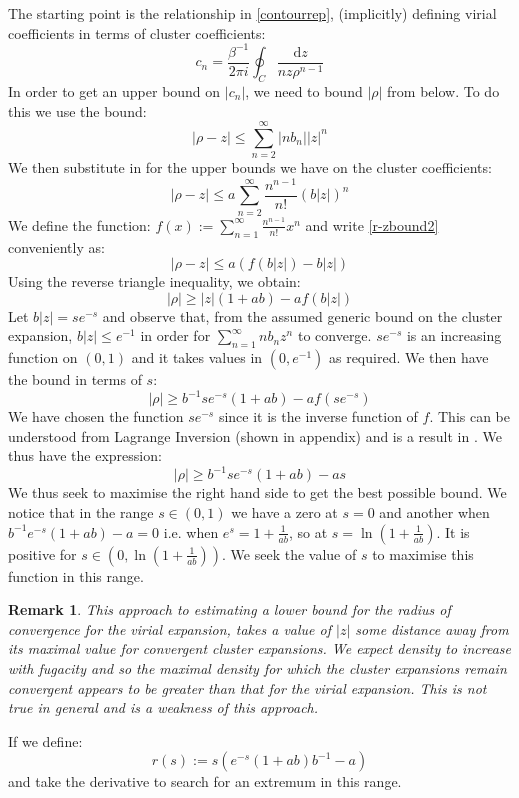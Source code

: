 \documentclass[reqno]{amsart}
\def\be{\begin{equation}}
\def\ee{\end{equation}}
\numberwithin{equation}{section}
\newtheorem{remark}{Remark}
\begin{document}
The starting point is the relationship in \eqref{contourrep}, (implicitly) defining virial coefficients in terms of cluster coefficients:
\be c_n=\frac{\beta^{-1}}{2 \pi i} \oint_C \frac{\mathrm{d}z}{nz\rho^{n-1}} \label{integralforvirial} \ee
In order to get an upper bound on $|c_n|$, we need to bound $|\rho|$ from below. To do this we use the bound:
\be |\rho-z| \leq \sum\limits_{n=2}^{\infty} |nb_n||z|^n \label{r-zbound} \ee
We then substitute in for the upper bounds we have on the cluster coefficients:
\be |\rho-z| \leq a \sum\limits_{n=2}^{\infty}\frac{n^{n-1}}{n!}(b|z|)^n \label{r-zbound2} \ee
We define the function: $f(x):=\sum\limits_{n=1}^{\infty}\frac{n^{n-1}}{n!}x^n$ and write \eqref{r-zbound2} conveniently as:
\be |\rho-z| \leq a(f(b|z|)-b|z|) \label{simplebound} \ee
Using the reverse triangle inequality, we obtain:
\be |\rho| \geq |z|(1+ab)-a f(b|z|) \label{rbound} \ee
Let $b|z|=se^{-s}$ and observe that, from the assumed generic bound on the cluster expansion, $b|z| \leq e^{-1}$ in order for $\sum\limits_{n=1}^{\infty}nb_nz^n$ to converge. $se^{-s}$ is an increasing function on $(0,1)$ and it takes values in $(0,e^{-1})$ as required. We then have the bound in terms of $s$:
\be |\rho|\geq b^{-1}se^{-s}(1+ab)-af(se^{-s}) \label{sfunction1} \ee
We have chosen the function $se^{-s}$ since it is the inverse function of $f$. This can be understood from Lagrange Inversion (shown in appendix) and is a result in \cite{CJK97} . We thus have the expression:
\be |\rho| \geq b^{-1}se^{-s}(1+ab)-as \label{sfunction2} \ee
We thus seek to maximise the right hand side to get the best possible bound. We notice that in the range $s \in (0,1)$ we have a zero at $s=0$ and another when $b^{-1}e^{-s}(1+ab)-a=0$ i.e. when $e^{s}=1+\frac{1}{ab}$, so at $s=\ln\left(1+\frac{1}{ab}\right)  $. It is positive for $s \in (0,\ln\left(1+\frac{1}{ab}\right))$. We seek the value of $s$ to maximise this function in this range.
\begin{remark}
This approach to estimating a lower bound for the radius of convergence for the virial expansion, takes a value of $|z|$ some distance away from its maximal value for convergent cluster expansions. We expect density to increase with fugacity and so the maximal density for which the cluster expansions remain convergent appears to be greater than that for the virial expansion. This is not true in general and is a weakness of this approach.
\end{remark}
If we define: 
\be r(s):=s(e^{-s}(1+ab)b^{-1}-a) \label{reqn} \ee
and take the derivative to search for an extremum in this range.
\end{document}
